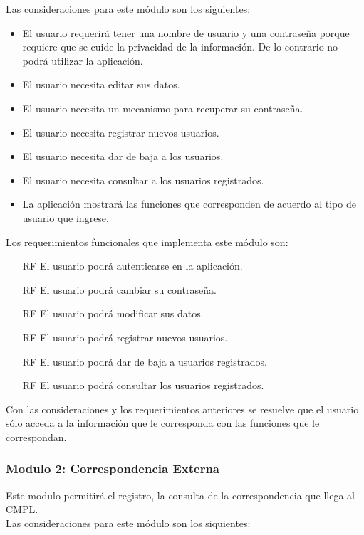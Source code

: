 Las consideraciones para este módulo son los siguientes:
\begin{itemize}
	\item El usuario requerirá tener una nombre de usuario y una contraseña porque requiere que se cuide la privacidad de la información. De lo contrario no podrá utilizar la aplicación.
	\item El usuario necesita editar sus datos.
	\item El usuario necesita un mecanismo para recuperar su contraseña.
	\item El usuario necesita registrar nuevos usuarios.
	\item El usuario necesita dar de baja a los usuarios.
	\item El usuario necesita consultar a los usuarios registrados.
	\item La aplicación mostrará las funciones que corresponden de acuerdo al tipo de usuario que ingrese.
\end{itemize} 

Los requerimientos funcionales que implementa este módulo son:
\begin{itemize}
	\item[RF] El usuario podrá autenticarse en la aplicación.
	\item[RF] El usuario podrá cambiar su contraseña.
	\item[RF] El usuario podrá modificar sus datos.
	\item[RF] El usuario podrá registrar nuevos usuarios.
	\item[RF] El usuario podrá dar de baja a usuarios registrados.
	\item[RF] El usuario podrá consultar los usuarios registrados.
\end{itemize}

Con las consideraciones y los requerimientos anteriores se resuelve que el usuario sólo acceda a la información que le corresponda con las funciones que le correspondan.

\subsubsection{Modulo 2: Correspondencia Externa}
Este modulo permitirá el registro, la consulta de la correspondencia que llega al CMPL. \\

Las consideraciones para este módulo son los siquientes:

